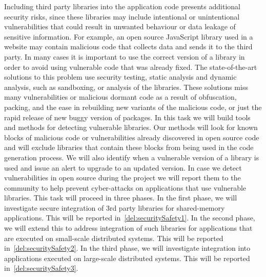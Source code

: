 \begin{Workpackage}{\thewpno}
\begin{Task}

\TaskResults{
\ref{del:securitySafety1}
\ref{del:securitySafety2}
\ref{del:securitySafety3}
%
}
\TaskHeader{}
Including third party libraries into the application code presents additional
security risks, since these libraries may include intentional or unintentional
vulnerabilities that could result in unwanted behaviour or data leakage of sensitive 
information. For example, an open source JavaScript library used in a website 
may contain malicious code that collects data and sends it to the third party. In many cases it
is important to use the correct version of a library in order to avoid using vulnerable code that was already fixed.
The state-of-the-art solutions to this problem use security  testing, static 
analysis and dynamic analysis, such as sandboxing, or analysis of the libraries.
These solutions miss many vulnerabilities or malicious dormant code as a result of 
obfuscation, packing, and the ease in rebuilding new variants of the malicious code, 
or just the rapid release of new buggy version of packages.
In this task we will build tools and methods for detecting vulnerable
libraries. Our methods will look for known blocks of malicious code or vulnerabilities already discovered in open source code and will exclude libraries that contain these blocks from being used in the code generation process. We will also  identify  when a vulnerable version of a library is used and issue an alert to upgrade to an updated version.
In case we detect vulnerabilities in open source during the \TheProject project we will report them to the community to help prevent cyber-attacks on applications that use vulnerable libraries.
This task will proceed in three phases. In the first phase, we will investigate secure integration of 3rd party libraries for shared-memory applications. This will be reported in~\ref{del:securitySafety1}. In the second phase, we will extend this to address integration of such libraries for applications that are executed on small-scale distributed systems. This will be reported in~\ref{del:securitySafety2}. In the third phase, we will investigate integration into applications executed on large-scale distributed systems. This will be reported in~\ref{del:securitySafety3}.
\end{Task}


\end{Workpackage}
